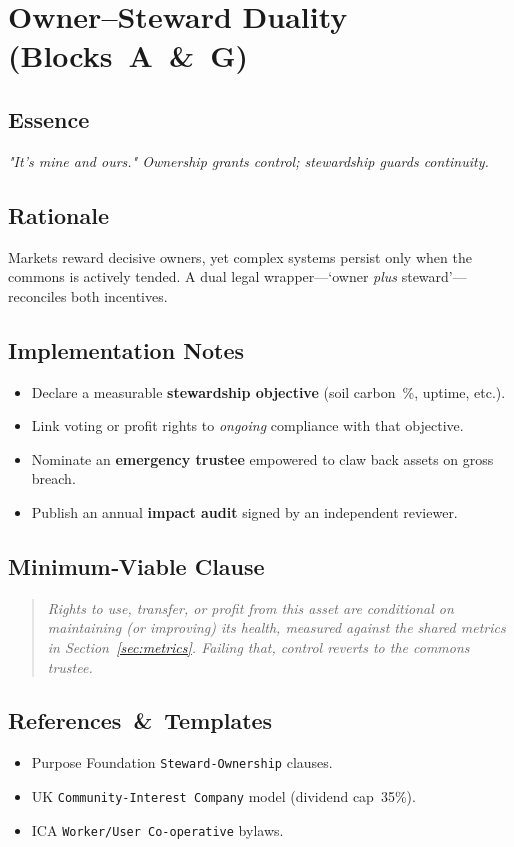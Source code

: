 \section{Owner–Steward Duality (Blocks A \& G)}
\subsection*{Essence}
\emph{"It’s mine \emph{and} ours." Ownership grants control; stewardship guards continuity.}

\subsection*{Rationale}
Markets reward decisive owners, yet complex systems persist only when the commons is actively tended.  A dual legal wrapper—`owner \emph{plus} steward'—reconciles both incentives.

\subsection*{Implementation Notes}
\begin{itemize}
  \item Declare a measurable \textbf{stewardship objective} (soil carbon \%, uptime, etc.).
  \item Link voting or profit rights to \emph{ongoing} compliance with that objective.
  \item Nominate an \textbf{emergency trustee} empowered to claw back assets on gross breach.
  \item Publish an annual \textbf{impact audit} signed by an independent reviewer.
\end{itemize}

\subsection*{Minimum‑Viable Clause}
\begin{quote}\itshape
Rights to use, transfer, or profit from this asset are conditional on maintaining (or improving) its health, measured against the shared metrics in Section~\ref{sec:metrics}.  Failing that, control reverts to the commons trustee.
\end{quote}

\subsection*{References \& Templates}
\begin{itemize}
  \item Purpose Foundation \texttt{Steward‑Ownership} clauses.
  \item UK \texttt{Community‑Interest Company} model (dividend cap 35\%).
  \item ICA \texttt{Worker/User Co‑operative} bylaws.
\end{itemize}


